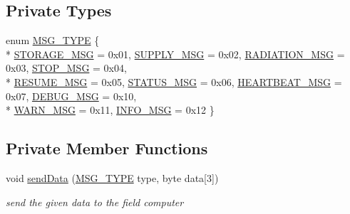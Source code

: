 \subsection*{Private Types}
\begin{DoxyCompactItemize}
\item 
enum \hyperlink{classBTClient_aa4e607f3ba1fea67548e2c2864915cb8}{M\-S\-G\-\_\-\-T\-Y\-P\-E} \{ \\*
\hyperlink{classBTClient_aa4e607f3ba1fea67548e2c2864915cb8a79c8b79e1404a0aadda91748f3a5b376}{S\-T\-O\-R\-A\-G\-E\-\_\-\-M\-S\-G} = 0x01, 
\hyperlink{classBTClient_aa4e607f3ba1fea67548e2c2864915cb8a2ec2a5bf9061a6e1fc643474d77dfdf5}{S\-U\-P\-P\-L\-Y\-\_\-\-M\-S\-G} = 0x02, 
\hyperlink{classBTClient_aa4e607f3ba1fea67548e2c2864915cb8a6a321a640ef7a6d5e9bbc48c66f0129f}{R\-A\-D\-I\-A\-T\-I\-O\-N\-\_\-\-M\-S\-G} = 0x03, 
\hyperlink{classBTClient_aa4e607f3ba1fea67548e2c2864915cb8ae247365f4eec434df1965c3c29780a52}{S\-T\-O\-P\-\_\-\-M\-S\-G} = 0x04, 
\\*
\hyperlink{classBTClient_aa4e607f3ba1fea67548e2c2864915cb8acfa47d734d92681292809deb82e0ae66}{R\-E\-S\-U\-M\-E\-\_\-\-M\-S\-G} = 0x05, 
\hyperlink{classBTClient_aa4e607f3ba1fea67548e2c2864915cb8a8b255c625c832b7f355c9797ca1a111c}{S\-T\-A\-T\-U\-S\-\_\-\-M\-S\-G} = 0x06, 
\hyperlink{classBTClient_aa4e607f3ba1fea67548e2c2864915cb8a234efd919c0dd46b09806b30a13b3b76}{H\-E\-A\-R\-T\-B\-E\-A\-T\-\_\-\-M\-S\-G} = 0x07, 
\hyperlink{classBTClient_aa4e607f3ba1fea67548e2c2864915cb8a52e6479fc2514e89e0ab286f4de4e2e7}{D\-E\-B\-U\-G\-\_\-\-M\-S\-G} = 0x10, 
\\*
\hyperlink{classBTClient_aa4e607f3ba1fea67548e2c2864915cb8a67a6a7aadd31c708cb5f53e19137f298}{W\-A\-R\-N\-\_\-\-M\-S\-G} = 0x11, 
\hyperlink{classBTClient_aa4e607f3ba1fea67548e2c2864915cb8af5b0d8cbe53a1d56f6df29fb896047f1}{I\-N\-F\-O\-\_\-\-M\-S\-G} = 0x12
 \}
\end{DoxyCompactItemize}
\subsection*{Private Member Functions}
\begin{DoxyCompactItemize}
\item 
void \hyperlink{classBTClient_a0561b17912b37892d4f4226d1769f7e8}{send\-Data} (\hyperlink{classBTClient_aa4e607f3ba1fea67548e2c2864915cb8}{M\-S\-G\-\_\-\-T\-Y\-P\-E} type, byte data\mbox{[}3\mbox{]})
\begin{DoxyCompactList}\small\item\em send the given data to the field computer \end{DoxyCompactList}\end{DoxyCompactItemize}
